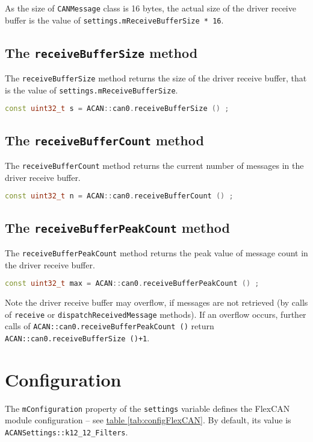 \documentclass[9pt, a4paper, obeyspaces, openany]{extarticle}
\newcommand \sectionLabel[2]{\section{#1}\label{sec:#2}}
\newcommand\refTableau[1]{\hyperref[tab:#1]{table \ref*{tab:#1}}}
\begin{document}
As the size of \texttt{CANMessage} class is 16 bytes, the actual size of the driver receive buffer is the value of \texttt{settings.mReceiveBufferSize * 16}.


\subsection{The \texttt{receiveBufferSize} method}

The \texttt{receiveBufferSize} method returns the size of the driver receive buffer, that is the value of \texttt{settings.mReceiveBufferSize}.
{ \small\begin{lstlisting}[language=c++]
const uint32_t s = ACAN::can0.receiveBufferSize () ;
\end{lstlisting}}


\subsection{The \texttt{receiveBufferCount} method}

The \texttt{receiveBufferCount} method returns the current number of messages in the driver receive buffer.
{ \small\begin{lstlisting}[language=c++]
const uint32_t n = ACAN::can0.receiveBufferCount () ;
\end{lstlisting}}


\subsection{The \texttt{receiveBufferPeakCount} method}

The \texttt{receiveBufferPeakCount} method returns the peak value of message count in the driver receive buffer.
{ \small\begin{lstlisting}[language=c++]
const uint32_t max = ACAN::can0.receiveBufferPeakCount () ;
\end{lstlisting}}

Note the driver receive buffer may overflow, if messages are not retrieved (by calls of \texttt{receive} or \texttt{dispatchReceivedMessage} methods). If an overflow occurs, further calls of \texttt{ACAN::can0.receiveBufferPeakCount ()} return \texttt{ACAN::can0.receiveBufferSize ()+1}.








\sectionLabel{Configuration}{FlexCANconfiguration}

The \texttt{mConfiguration} property of the \texttt{settings} variable defines the FlexCAN module configuration -- see \refTableau {configFlexCAN}. By default, its value is \texttt{ACANSettings::k12\_12\_Filters}.
\end{document}
